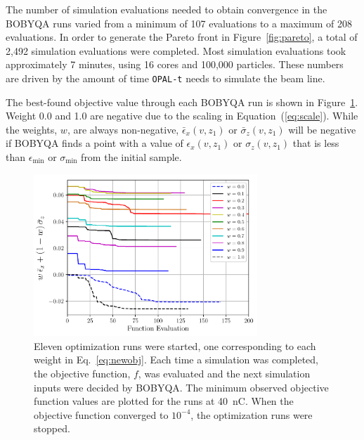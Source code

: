 The number of simulation evaluations needed to obtain convergence
in the BOBYQA runs varied from a minimum of 107 evaluations to a maximum of 208 
evaluations. In order to generate the Pareto front in
Figure~\ref{fig:pareto}, a total of 2,492 simulation evaluations were completed.
Most simulation evaluations took approximately 7 minutes, using 16 cores and 100,000 particles. These numbers are driven by the amount of time \verb|OPAL-t| needs to simulate the beam line. 

The best-found objective value through each BOBYQA run is shown in Figure~\ref{fig:iterations}. 
Weight 0.0 and 1.0 are negative due to the scaling in Equation~(\ref{eq:scale}). While the weights, $w$, are always non-negative, 
$\bar{\epsilon}_x (v,z_1)$ or $\bar{\sigma}_z(v,z_1)$ will be negative if BOBYQA finds a point with a value of 
$\epsilon_x(v,z_1)$ or $\sigma_z(v,z_1)$ that is less than $\epsilon_{\min}$ or $\sigma_{\min}$ from the initial sample. 
\begin{figure}%
	\begin{center}
		\includegraphics[width=0.75\textwidth]{images/THPAB155f2}
		\caption{\label{fig:iterations}Eleven optimization runs were started, one corresponding to each weight in Eq.~\ref{eq:newobj}.
			Each time a simulation was completed, the objective function, $f$, was evaluated and the next simulation inputs were 
			decided by BOBYQA. The minimum observed objective function values are plotted for the runs at \SI{40}{nC}.
			When the objective function converged to $10^{-4}$, the optimization runs were stopped. 
		}
	\end{center}
\end{figure}

